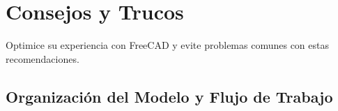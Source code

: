 \documentclass[12pt]{article}
\begin{document}

\newpage

\section{Consejos y Trucos}
Optimice su experiencia con FreeCAD y evite problemas comunes con estas recomendaciones.

\subsection{Organización del Modelo y Flujo de Trabajo}
\end{document}

